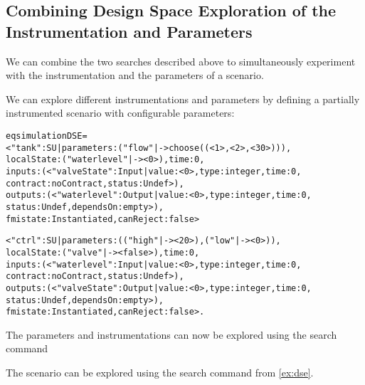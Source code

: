 \subsection{Combining Design Space Exploration of the Instrumentation and Parameters}
We can combine the two searches described above to simultaneously experiment with the instrumentation and the parameters of a scenario.

\begin{example}
  We can explore different instrumentations and parameters by defining a partially instrumented scenario with configurable parameters:

\scriptsize
\begin{alltt}
eq simulationDSE =  
< "tank" : SU | parameters : ("flow" |-> choose((< 1 >,< 2 >,< 30 >))), 
localState : ( "waterlevel" |-> < 0 > ) , time : 0, 
inputs : (< "valveState" : Input | value : < 0 >, type : integer, time : 0, 
                                   contract : noContract, status : Undef  >), 
outputs : (< "waterlevel" : Output | value : < 0 >, type : integer, time : 0, 
                                     status : Undef, dependsOn : empty >), 
fmistate : Instantiated, canReject : false >

< "ctrl" : SU | parameters : (("high" |-> < 20 >) , ("low" |-> < 0 >)), 
localState : ( "valve" |-> < false >), time : 0, 
inputs : (< "waterlevel" : Input | value : < 0 >, type : integer, time : 0, 
                                   contract : noContract, status : Undef  >), 
outputs : (< "valveState" : Output | value : < 0 >, type : integer, time : 0, 
                                     status : Undef, dependsOn : empty >), 
fmistate : Instantiated, canReject : false > .
\end{alltt}

The parameters and instrumentations can now be explored using the search command 
\normalsize

The scenario can be explored using the search command from \cref{ex:dse}. 
\end{example}



